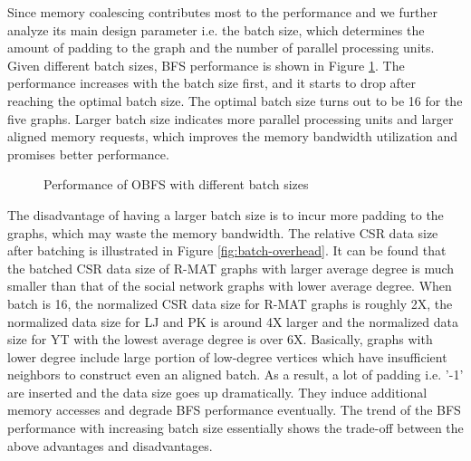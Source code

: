 
Since memory coalescing contributes most to the performance and we further analyze 
its main design parameter i.e. the batch size, which determines the amount of 
padding to the graph and the number of parallel processing units.
Given different batch sizes, BFS performance is shown in Figure \ref{fig:batch-perf}.
The performance increases with the batch size first, and it starts to drop after reaching 
the optimal batch size. The optimal batch size turns out to be 16 for the five graphs. 
Larger batch size indicates more parallel processing units and larger aligned 
memory requests, which improves the memory bandwidth utilization and promises 
better performance. 

\begin{figure}
    \caption{Performance of OBFS with different batch sizes}
\label{fig:batch-perf}
\vspace{-1em}
\end{figure}

The disadvantage of having a larger batch size is to incur more padding to 
the graphs, which may waste the memory bandwidth. 
The relative CSR data size after batching is illustrated in Figure \ref{fig:batch-overhead}. 
It can be found that the batched CSR data size of R-MAT graphs with larger average 
degree is much smaller than that of the social network graphs with lower average degree.
When batch is 16, the normalized CSR data size for R-MAT graphs is roughly 2X, the normalized data size 
for LJ and PK is around 4X larger and the normalized data size for YT with the lowest average degree 
is over 6X. Basically, graphs with lower degree include large portion of low-degree 
vertices which have insufficient neighbors to construct even an aligned batch. As a result, 
a lot of padding i.e. '-1' are inserted and the data size goes up dramatically. 
They induce additional memory accesses and degrade BFS performance eventually.
The trend of the BFS performance with increasing batch size essentially 
shows the trade-off between the above advantages and disadvantages.

